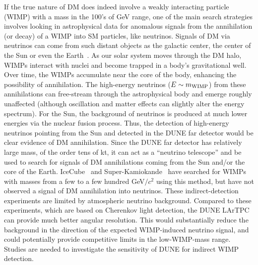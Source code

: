 If the true nature of DM does indeed involve a weakly interacting particle (WIMP) with a mass in the 100's of GeV range, one of the main search strategies involves looking in astrophysical data for anomalous signals from the %
annihilation (or decay) of a WIMP into SM particles, like neutrinos. Signals of DM via neutrinos can come from such distant objects as the galactic center, the center of the Sun or even the Earth~\cite{Press:1985ug,Silk:1985ax,Gaisser:1986ha,Gould:1987ir,Cirelli:2005gh}. As our solar system moves through the DM halo, WIMPs interact with nuclei %
 and become trapped in a body's gravitational well.  Over time, the WIMPs accumulate near the core of the body, enhancing the possibility of annihilation. The high-energy neutrinos ($E\sim m_{\rm WIMP}$) from these annihilations can free-stream through the astrophysical body and emerge roughly unaffected (although oscillation and matter effects can slightly alter the energy spectrum).  For the Sun, the background of neutrinos is produced at much lower energies via the nuclear fusion process. Thus, the detection of high-energy neutrinos pointing from the Sun and detected in the DUNE far detector would be clear evidence of DM annihilation.  Since the DUNE far detector has relatively large mass, of the order tens of kt, it can act as a ``neutrino telescope'' and be used to search for signals of DM annihilations coming from the Sun and/or the core of the Earth.  IceCube~\cite{Aartsen:2012kia} and Super-Kamiokande~\cite{Choi:2015ara} have searched for WIMPs with masses from a few to a few hundred GeV$/c^2$ using this method, but have not observed a signal of DM annihilation into neutrinos.  These indirect-detection experiments  are limited by atmospheric neutrino background.  Compared to these experiments, which are based on Cherenkov light detection, the DUNE LArTPC can provide much better angular resolution. This would substantially reduce the background in the direction of the expected WIMP-induced neutrino signal, and could potentially provide competitive limits in the low-WIMP-mass range.  Studies are needed to investigate the sensitivity of DUNE for indirect WIMP detection.

